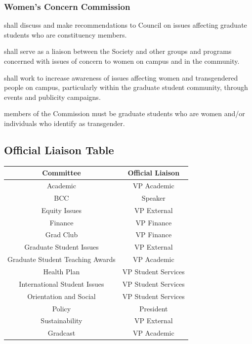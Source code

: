 \subsubsection {Women's Concern Commission}
\begin{longenum}[ label*=\thesubsubsection.\arabic*., align=left]
	\item shall discuss and make recommendations to Council on issues affecting graduate students who are constituency members.
    \item shall serve as a liaison between the Society and other groups and programs concerned with issues of concern to women on campus and in the community.
    \item shall work to increase awareness of issues affecting women and transgendered people on campus, particularly within the graduate student community, through events and publicity campaigns.
    \item members of the Commission must be graduate students who are women and/or individuals who identify as transgender.

\end{longenum}

\newpage
\subsection{Official Liaison Table}
\begin{center}
    \begin{tabular}{  c | c }
\index{Committee!Official Liaison Table}
\index{Executive, The!Official Liaison Table}
    Committee & Official Liaison  \\ \hline 
    Academic & VP Academic \\ 
    BCC & Speaker \\ 
    Equity Issues & VP External \\ 
    Finance & VP Finance  \\ 
    Grad Club & VP Finance  \\ 
    Graduate Student Issues & VP External \\ 
    Graduate Student Teaching Awards & VP Academic \\ 
    Health Plan & VP Student Services \\ 
    International Student Issues &  VP Student Services \\ 
    Orientation and Social & VP Student Services \\  
    Policy & President \\ 
    Sustainability &VP External \\ 
    Gradcast & VP Academic \\ 

\end{tabular}
\end{center}

